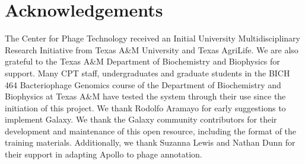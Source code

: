 \section*{Acknowledgements}

The Center for Phage Technology received an Initial University
Multidisciplinary Research Initiative from Texas A\&M University and
Texas AgriLife. We are also grateful to the Texas A\&M Department of
Biochemistry and Biophysics for support. Many CPT staff, undergraduates
and graduate students in the BICH 464 Bacteriophage Genomics course of
the Department of Biochemistry and Biophysics at Texas A\&M have tested
the system through their use since the initiation of this project. We
thank Rodolfo Aramayo for early suggestions to implement Galaxy. We
thank the Galaxy community contributors for their development and
maintenance of this open resource, including the format of the training
materials. Additionally, we thank Suzanna Lewis and Nathan Dunn for
their support in adapting Apollo to phage annotation.


\footnotesize


\normalsize
